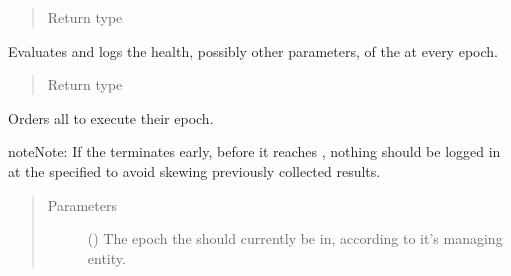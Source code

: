 \documentclass[letterpaper,10pt,english]{sphinxmanual}
\begin{document}
\begin{fulllineitems}
\begin{fulllineitems}
\begin{quote}
\begin{description}
\item[{Return type}] \leavevmode
{}

\end{description}\end{quote}

\end{fulllineitems}


\begin{fulllineitems}
\label{\detokenize{app.domain:app.domain.cluster_groups.SGCluster.evaluate}}
Evaluates and logs the health, possibly other parameters, of the
 at every epoch.
\begin{quote}\begin{description}
\item[{Return type}] \leavevmode
{}

\end{description}\end{quote}

\end{fulllineitems}


\begin{fulllineitems}
\label{\detokenize{app.domain:app.domain.cluster_groups.SGCluster.execute_epoch}}
Orders all  to execute their epoch.

\begin{sphinxadmonition}{note}{Note:}
If the  terminates early, before it reaches
{\hyperref[\detokenize{app.domain:app.domain.master_servers.Master.MAX_EPOCHS}]{}},
nothing should be logged in
{\hyperref[\detokenize{app.domain.helpers:app.domain.helpers.smart_dataclasses.LoggingData}]{}}
at the specified  to avoid skewing previously
collected results.
\end{sphinxadmonition}
\begin{quote}\begin{description}
\item[{Parameters}] \leavevmode
{} () \textendash{} The epoch the  should currently be in, according
to it’s managing  entity.


\end{description}
\end{quote}
\end{fulllineitems}
\end{fulllineitems}
\end{document}
